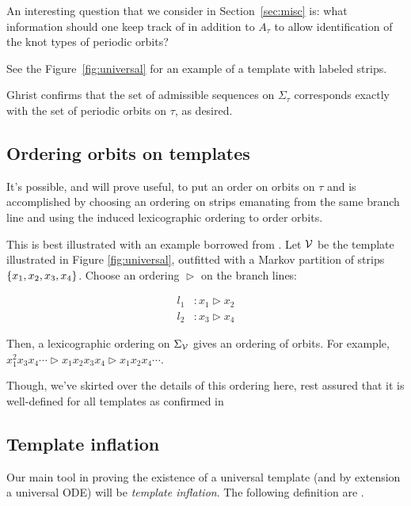 \documentclass[main.tex]{subfiles}
\begin{document}
 An interesting question that we consider
in Section~\ref{sec:misc} is: what information should one keep track of in addition to $A_\tau$ to allow identification of the knot types of periodic orbits?

See the Figure~\ref{fig:universal} for an example of a template with labeled strips.

Ghrist confirms that the set of admissible sequences on $\Sigma_\tau$ corresponds exactly with the set of periodic orbits on $\tau$, as desired.


\subsection{Ordering orbits on templates}

It's possible, and will prove useful, to put an order on orbits on $\tau$ and is accomplished by choosing an ordering on strips emanating from the same branch line and using the induced lexicographic ordering to order orbits.

This is best illustrated with an example borrowed from \cite{knottyode}. Let $\mathcal{V}$ be the template illustrated in Figure \ref{fig:universal}, outfitted with a Markov partition of strips $\{ x_1, x_2, x_3, x_4 \}$.
Choose an ordering $\vartriangleright$ on the branch lines:

\begin{align}
  l_1 &: x_1 \vartriangleright x_2 \\
  l_2 &: x_3 \vartriangleright x_4
\end{align}

Then, a lexicographic ordering on $\Sigma_{\mathcal{V}}$ gives an ordering of orbits. For example, $x_1^2 x_3 x_4 \cdots \vartriangleright x_1 x_2 x_3 x_4 \vartriangleright x_1 x_2 x_4 \cdots$.

Though, we've skirted over the details of this ordering here, rest assured that it is well-defined for all templates as confirmed in \cite{Holmes1989}\cite{Holmes1985}\cite{knottyode}


\subsection{Template inflation}

Our main tool in proving the existence of a universal template (and by extension a universal ODE) will be \emph{template inflation}. The following definition are \cite{knottyode}.
\end{document}
